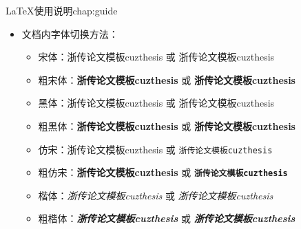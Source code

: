 \begin{cuzchapter}{\LaTeX{}使用说明}{chap:guide}
\begin{itemize}
\begin{itemize}
            \item 文档超链接的颜色及其显示：修改 \verb|\hypersetup|
        \end{itemize}
    \item 文档内字体切换方法：
        \begin{itemize}
            \item 宋体：浙传论文模板cuzthesis 或 \textrm{浙传论文模板cuzthesis}
            \item 粗宋体：{\bfseries 浙传论文模板cuzthesis} 或 \textbf{浙传论文模板cuzthesis}
            \item 黑体：{\sffamily 浙传论文模板cuzthesis} 或 \textsf{浙传论文模板cuzthesis}
            \item 粗黑体：{\bfseries\sffamily 浙传论文模板cuzthesis} 或 \textsf{\bfseries 浙传论文模板cuzthesis}
            \item 仿宋：{\ttfamily 浙传论文模板cuzthesis} 或 \texttt{浙传论文模板cuzthesis}
            \item 粗仿宋：{\bfseries\ttfamily 浙传论文模板cuzthesis} 或 \texttt{\bfseries 浙传论文模板cuzthesis}
            \item 楷体：{\itshape 浙传论文模板cuzthesis} 或 \textit{浙传论文模板cuzthesis}
            \item 粗楷体：{\bfseries\itshape 浙传论文模板cuzthesis} 或 \textit{\bfseries 浙传论文模板cuzthesis}
        \end{itemize}
\end{itemize}

\end{cuzchapter}
